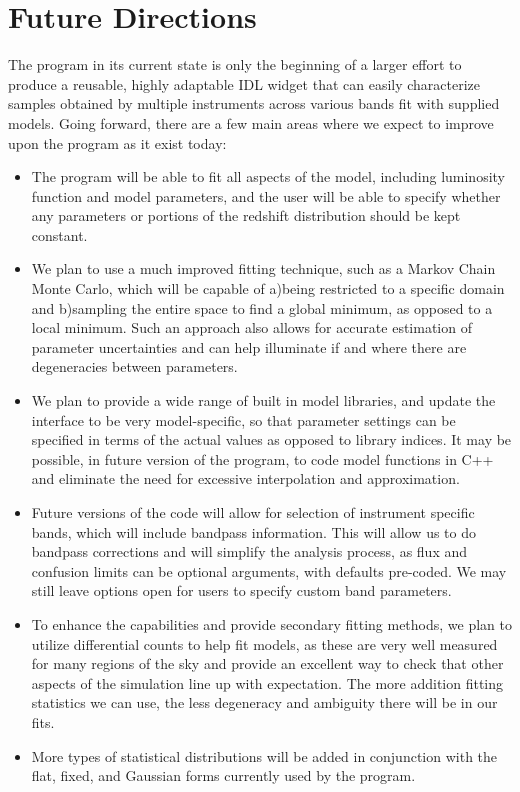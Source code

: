 \documentclass[twocolumn,letterpaper,10pt]{article}
\begin{document}
\section{Future Directions}\label{fdirs}

The program in its current state is only the beginning of a larger effort to produce a reusable, highly adaptable IDL widget that can easily characterize samples obtained by multiple instruments across various bands fit with supplied models. Going forward, there are a few main areas where we expect to improve upon the program as it exist today:
\begin{itemize} \itemsep0pt \parskip0pt 
\item The program will be able to fit all aspects of the model, including luminosity function and model parameters, and the user will be able to specify whether any parameters or portions of the redshift distribution should be kept constant.
\item We plan to use a much improved fitting technique, such as a Markov Chain Monte Carlo, which will be capable of a)being restricted to a specific domain and b)sampling the entire space to find a global minimum, as opposed to a local minimum. Such an approach also allows for accurate estimation of parameter uncertainties and can help illuminate if and where there are degeneracies between parameters.
\item We plan to provide a wide range of built in model libraries, and update the interface to be very model-specific, so that parameter settings can be specified in terms of the actual values as opposed to library indices. It may be possible, in future version of the program, to code model functions in C++ and eliminate the need for excessive interpolation and approximation.
\item Future versions of the code will allow for selection of instrument specific bands, which will include bandpass information. This will allow us to do bandpass corrections and will simplify the analysis process, as flux and confusion limits can be optional arguments, with defaults pre-coded. We may still leave options open for users to specify custom band parameters.
\item To enhance the capabilities and provide secondary fitting methods, we plan to utilize differential counts to help fit models, as these are very well measured for many regions of the sky and provide an excellent way to check that other aspects of the simulation line up with expectation. The more addition fitting statistics we can use, the less degeneracy and ambiguity there will be in our fits.
\item More types of statistical distributions will be added in conjunction with the flat, fixed, and Gaussian forms currently used by the program.
\end{itemize}
\end{document}
